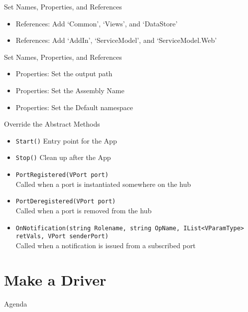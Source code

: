 \documentclass[11pt]{beamer}
\begin{document}
\begin{frame}{Set Names, Properties, and References}
    \begin{itemize}
        \item References: Add `Common', `Views', and `DataStore'
        \item References: Add `AddIn', `ServiceModel', and `ServiceModel.Web'
    \end{itemize}
\end{frame}

\begin{frame}{Set Names, Properties, and References}
    \begin{itemize}
        \item Properties: Set the output path
        \item Properties: Set the Assembly Name
        \item Properties: Set the Default namespace
    \end{itemize}
\end{frame}

\begin{frame}{Override the Abstract Methods}
    \begin{itemize}
        \item \texttt{Start()} Entry point for the App
        \item \texttt{Stop()}  Clean up after the App
        \item \texttt{PortRegistered(VPort port)}\\ Called when a port is instantiated somewhere on the hub
        \item \texttt{PortDeregistered(VPort port)}\\ Called when a port is removed from the hub
        \item \texttt{OnNotification(string Rolename, string OpName, IList<VParamType> retVals, VPort senderPort)}\\ Called when a notification is issued from a subscribed port
    \end{itemize}
\end{frame}

\section{Make a Driver}

\begin{frame}{Agenda}
\tableofcontents
\end{frame}
\end{document}
